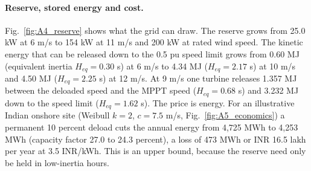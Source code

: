 \paragraph{Reserve, stored energy and cost.} Fig.~\ref{fig:A4_reserve} shows what the grid can draw. The reserve grows from 25.0 kW at 6 m/s to 154 kW at 11 m/s and 200 kW at rated wind speed. The kinetic energy that can be released down to the 0.5 pu speed limit grows from 0.60 MJ (equivalent inertia $H_{eq}=0.30$ s) at 6 m/s to 4.34 MJ ($H_{eq}=2.17$ s) at 10 m/s and 4.50 MJ ($H_{eq}=2.25$ s) at 12 m/s. At 9 m/s one turbine releases 1.357 MJ between the deloaded speed and the MPPT speed ($H_{eq}=0.68$ s) and 3.232 MJ down to the speed limit ($H_{eq}=1.62$ s). The price is energy. For an illustrative Indian onshore site (Weibull $k=2$, $c=7.5$ m/s, Fig.~\ref{fig:A5_economics}) a permanent 10 percent deload cuts the annual energy from 4,725 MWh to 4,253 MWh (capacity factor 27.0 to 24.3 percent), a loss of 473 MWh or INR 16.5 lakh per year at 3.5 INR/kWh. This is an upper bound, because the reserve need only be held in low-inertia hours.
